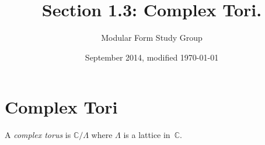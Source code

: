 \documentclass{article}
\theoremstyle{plain}
\theoremstyle{definition}
\theoremstyle{remark}
\newcommand{\C}{\mathbb{C}}
\begin{document}
 

\title{Section 1.3: Complex Tori.}

\author{Modular Form Study Group}

\date{September 2014, modified \today}

\maketitle


\section{Complex Tori}

A \emph{complex torus} is $\C / \Lambda$ where $\Lambda$ is a lattice in~$\C$.
\end{document}
